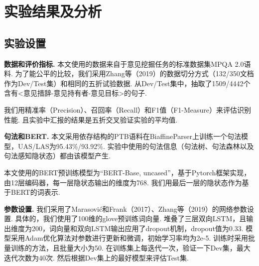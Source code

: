 
\section{实验结果及分析}
\subsection{实验设置}
\textbf{数据和评价指标. } 本文使用的数据来自于意见挖掘任务的标准数据集MPQA 2.0语料. 为了能公平的比较，我们采用Zhang等（2019）的数据切分方式（132/350文档作为Dev/Test集）和相同的五折试验数据. 从Dev/Test集中，抽取了1509/4442个含有<意见措辞-意见持有者-意见目标>的句子.

我们用精准率（Precision）、召回率（Recall）和F1值（F1-Measure）来评估识别性能. 且实验中汇报的结果是五折交叉验证实验的平均值.

\textbf{句法和BERT. }
本文采用依存结构的PTB语料在BiaffineParser上训练一个句法模型，UAS/LAS为95.43\%/93.92\%. 实验中使用的句法信息（句法树、句法森林以及句法感知隐状态）都由该模型产生.

本文使用的BERT预训练模型为“BERT-Base, uncased”，基于Pytorch框架实现，由12层编码器，每一层隐状态输出的维度为768. 我们用最后一层的隐状态作为基于BERT的词表示.

\textbf{参数设置. }
我们采用了Marasovi{\'c}和Frank（2017）、Zhang等（2019）的网络参数设置. 具体的，我们使用了100维的glove预训练词向量. 堆叠了三层双向LSTM，且输出维度为200，词向量和双向LSTM输出应用了dropout机制，dropout值为0.33. 模型采用Adam优化算法对参数进行更新和微调，初始学习率均为2e-5. 训练时采用批量训练的方法，且批量大小为50. 在训练集上每迭代一次，验证一下Dev集，最大迭代次数为40次. 然后根据Dev集上的最好模型来评估Test集.


